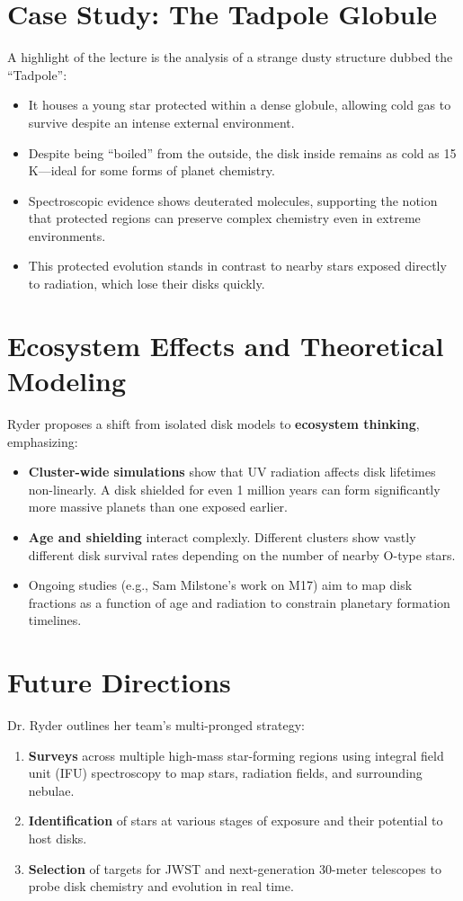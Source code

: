 \documentclass[12pt]{article}
\begin{document}
\section*{Case Study: The Tadpole Globule}
A highlight of the lecture is the analysis of a strange dusty structure dubbed the “Tadpole”:
\begin{itemize}
    \item It houses a young star protected within a dense globule, allowing cold gas to survive despite an intense external environment.
    \item Despite being ``boiled'' from the outside, the disk inside remains as cold as 15 K---ideal for some forms of planet chemistry.
    \item Spectroscopic evidence shows deuterated molecules, supporting the notion that protected regions can preserve complex chemistry even in extreme environments.
    \item This protected evolution stands in contrast to nearby stars exposed directly to radiation, which lose their disks quickly.
\end{itemize}

\section*{Ecosystem Effects and Theoretical Modeling}
Ryder proposes a shift from isolated disk models to \textbf{ecosystem thinking}, emphasizing:
\begin{itemize}
    \item \textbf{Cluster-wide simulations} show that UV radiation affects disk lifetimes non-linearly. A disk shielded for even 1 million years can form significantly more massive planets than one exposed earlier.
    \item \textbf{Age and shielding} interact complexly. Different clusters show vastly different disk survival rates depending on the number of nearby O-type stars.
    \item Ongoing studies (e.g., Sam Milstone’s work on M17) aim to map disk fractions as a function of age and radiation to constrain planetary formation timelines.
\end{itemize}

\section*{Future Directions}
Dr. Ryder outlines her team’s multi-pronged strategy:
\begin{enumerate}
    \item \textbf{Surveys} across multiple high-mass star-forming regions using integral field unit (IFU) spectroscopy to map stars, radiation fields, and surrounding nebulae.
    \item \textbf{Identification} of stars at various stages of exposure and their potential to host disks.
    \item \textbf{Selection} of targets for JWST and next-generation 30-meter telescopes to probe disk chemistry and evolution in real time.
\end{enumerate}
\end{document}
